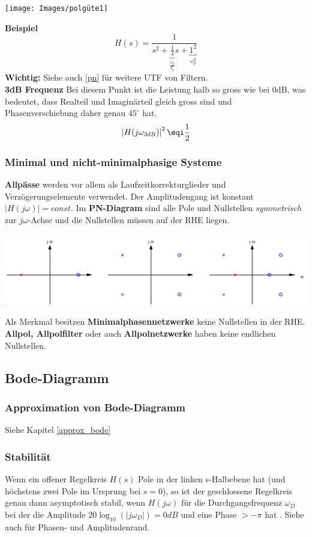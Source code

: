 \begin{center}
	\texttt{[image: Images/polgüte1]}
\end{center}

\noindent\textbf{Beispiel}
\[
H(s) = \frac{1}{s^2 + \underbrace{\frac{1}{4}}_{\frac{\omega_p}{q_p}}s + \underbrace{1^2}_{\omega_p^2}}
\]
\textbf{Wichtig:} Siehe auch \ref{pn} für weitere UTF von Filtern.\\

\noindent\textbf{3dB Frequenz}
Bei diesem Punkt ist die Leistung halb so gross wie bei 0dB, was bedeutet, dass Realteil und Imaginärteil gleich gross sind und Phasenverschiebung daher genau $45^\circ$ hat.
\[
\left|H(j\omega_{3dB})\right|^2 \eqi \frac{1}{2}
\]

\subsubsection{Minimal und nicht-minimalphasige Systeme}
\textbf{Allpässe} werden vor allem als Laufzeitkorrekturglieder und Verzögerungselemente verwendet. Der Amplitudengang ist konstant $\left|H(j\omega)\right| = const$. Im \textbf{PN-Diagram} sind alle Pole und Nullstellen \textit{symmetrisch} zur $j\omega$-Achse und die Nullstellen müssen auf der RHE liegen.
\begin{center}
	\includegraphics[width=0.8\columnwidth]{Images/allpass}
\end{center}

\noindent Als Merkmal besitzen \textbf{Minimalphasennetzwerke} keine Nullstellen in der RHE.\\

\noindent \textbf{Allpol, Allpolfilter} oder auch \textbf{Allpolnetzwerke} haben keine endlichen Nullstellen.
\subsection{Bode-Diagramm}
\subsubsection{Approximation von Bode-Diagramm}
Siehe Kapitel \ref{approx_bode}

\subsubsection{Stabilität}
Wenn ein offener Regelkreis $H(s)$ Pole in der linken s-Halbebene hat (und höchstens zwei Pole im Ursprung bei $s=0$), so ist der geschlossene Regelkreis genau dann asymptotisch stabil, wenn $H(j\omega)$ für die Durchgangsfrequenz $\omega_D$ bei der die Amplitude $20\log_{10}(\left|j\omega_D\right|) = 0dB$ und eine Phase $> -\pi$ hat . Siehe auch  für Phasen- und Amplitudenrand.

